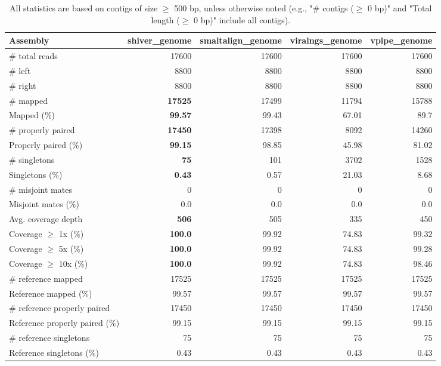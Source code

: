 \documentclass[12pt,a4paper]{article}
\begin{document}
\begin{table}[ht]
\begin{center}
\caption{All statistics are based on contigs of size $\geq$ 500 bp, unless otherwise noted (e.g., "\# contigs ($\geq$ 0 bp)" and "Total length ($\geq$ 0 bp)" include all contigs).}
\begin{tabular}{|l*{4}{|r}|}
\hline
Assembly & shiver\_genome & smaltalign\_genome & viralngs\_genome & vpipe\_genome \\ \hline
\# total reads & 17600 & 17600 & 17600 & 17600 \\ \hline
\# left & 8800 & 8800 & 8800 & 8800 \\ \hline
\# right & 8800 & 8800 & 8800 & 8800 \\ \hline
\# mapped & {\bf 17525} & 17499 & 11794 & 15788 \\ \hline
Mapped (\%) & {\bf 99.57} & 99.43 & 67.01 & 89.7 \\ \hline
\# properly paired & {\bf 17450} & 17398 & 8092 & 14260 \\ \hline
Properly paired (\%) & {\bf 99.15} & 98.85 & 45.98 & 81.02 \\ \hline
\# singletons & {\bf 75} & 101 & 3702 & 1528 \\ \hline
Singletons (\%) & {\bf 0.43} & 0.57 & 21.03 & 8.68 \\ \hline
\# misjoint mates & 0 & 0 & 0 & 0 \\ \hline
Misjoint mates (\%) & 0.0 & 0.0 & 0.0 & 0.0 \\ \hline
Avg. coverage depth & {\bf 506} & 505 & 335 & 450 \\ \hline
Coverage $\geq$ 1x (\%) & {\bf 100.0} & 99.92 & 74.83 & 99.32 \\ \hline
Coverage $\geq$ 5x (\%) & {\bf 100.0} & 99.92 & 74.83 & 99.28 \\ \hline
Coverage $\geq$ 10x (\%) & {\bf 100.0} & 99.92 & 74.83 & 98.46 \\ \hline
\# reference mapped & 17525 & 17525 & 17525 & 17525 \\ \hline
Reference mapped (\%) & 99.57 & 99.57 & 99.57 & 99.57 \\ \hline
\# reference properly paired & 17450 & 17450 & 17450 & 17450 \\ \hline
Reference properly paired (\%) & 99.15 & 99.15 & 99.15 & 99.15 \\ \hline
\# reference singletons & 75 & 75 & 75 & 75 \\ \hline
Reference singletons (\%) & 0.43 & 0.43 & 0.43 & 0.43 \\ \hline

\end{tabular}
\end{center}
\end{table}
\end{document}
